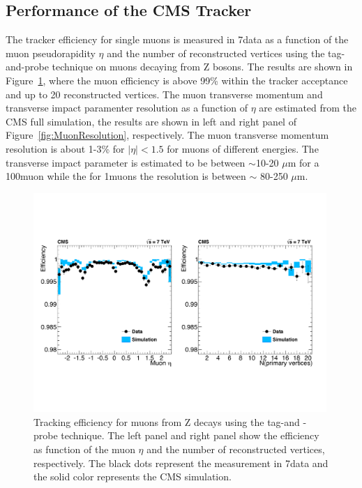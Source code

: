 \subsection{Performance of the CMS Tracker}

The tracker efficiency for single muons is measured in 7\TeV data as a
function of the muon pseudorapidity $\eta$ and the number of
reconstructed vertices using the tag-and-probe technique on muons
decaying from Z bosons. The results are shown in
Figure~\ref{fig:MuonEfficiency}, where the muon efficiency is above
99\% within the tracker acceptance and up to 20 reconstructed
vertices. The muon transverse momentum and transverse impact
paramenter resolution as a function of  $\eta$ are estimated from the
CMS full simulation, the results are shown in left and right panel of
Figure~\ref{fig:MuonResolution}, respectively. The muon transverse
momentum resolution is about 1-3\% for $|\eta|<1.5$ for muons of
different energies. The transverse impact parameter is estimated to be
between $\sim$10-20 $\mu$m for a 100\GeV muon while the for 1\GeV muons the
resolution is between $\sim$ 80-250 $\mu$m.

\begin{figure}
 \centering
\includegraphics[width=0.99\textwidth]{CMS_DetectorFigures/TrackerMuonEff.pdf}
\caption{Tracking efficiency for muons from Z decays using the tag-and
 -probe technique. The left panel and right panel show the efficiency
 as function of the muon $\eta$ and the number of reconstructed
 vertices, respectively. The black dots represent the measurement in
 7\TeV data and the solid color represents the CMS simulation.\label{fig:MuonEfficiency}}
\end{figure}

